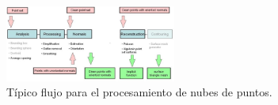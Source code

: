 \begin{figure}[H]
  \centering
    \includegraphics[width=0.5\textwidth]{./Cap2_videomapping/malla-flow.png}
  \caption{Típico flujo para el procesamiento de nubes de puntos.}%
  \label{fig:Mesh-CGAL}
\end{figure}
